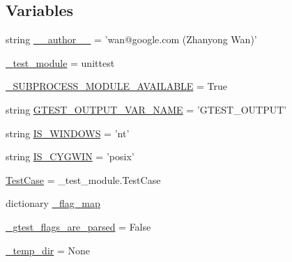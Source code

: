 \subsection*{\-Variables}
\begin{DoxyCompactItemize}
\item 
string \hyperlink{namespacegtest__test__utils_a629d61dfe4da763164a4d1a2d85b0afd}{\-\_\-\-\_\-author\-\_\-\-\_\-} = 'wan@google.\-com (\-Zhanyong \-Wan)'
\item 
\hyperlink{namespacegtest__test__utils_abb53641dd3dd87362c1a92d4aa8b7a1b}{\-\_\-test\-\_\-module} = unittest
\item 
\hyperlink{namespacegtest__test__utils_a4a6c82f32cfeed696bda345b2d1b0492}{\-\_\-\-S\-U\-B\-P\-R\-O\-C\-E\-S\-S\-\_\-\-M\-O\-D\-U\-L\-E\-\_\-\-A\-V\-A\-I\-L\-A\-B\-L\-E} = \-True
\item 
string \hyperlink{namespacegtest__test__utils_a8e9bea8be495f8832f4c6f383537be2d}{\-G\-T\-E\-S\-T\-\_\-\-O\-U\-T\-P\-U\-T\-\_\-\-V\-A\-R\-\_\-\-N\-A\-M\-E} = '\-G\-T\-E\-S\-T\-\_\-\-O\-U\-T\-P\-U\-T'
\item 
string \hyperlink{namespacegtest__test__utils_ab1b21b880253abfa3ab3dfc19b06814c}{\-I\-S\-\_\-\-W\-I\-N\-D\-O\-W\-S} = 'nt'
\item 
string \hyperlink{namespacegtest__test__utils_a090f13f753565f0975ff715f23561d2c}{\-I\-S\-\_\-\-C\-Y\-G\-W\-I\-N} = 'posix'
\item 
\hyperlink{namespacegtest__test__utils_a61fe0349d692eb6d4f5b94e35049b2e9}{\-Test\-Case} = \-\_\-test\-\_\-module.\-Test\-Case
\item 
dictionary \hyperlink{namespacegtest__test__utils_a248330712747692dbcce3fa978ed289e}{\-\_\-flag\-\_\-map}
\item 
\hyperlink{namespacegtest__test__utils_a59c07e23a54adb665cbc6ffb8038bd8d}{\-\_\-gtest\-\_\-flags\-\_\-are\-\_\-parsed} = \-False
\item 
\hyperlink{namespacegtest__test__utils_a96b285a02c0107127d6c268dbccd8999}{\-\_\-temp\-\_\-dir} = \-None
\end{DoxyCompactItemize}


